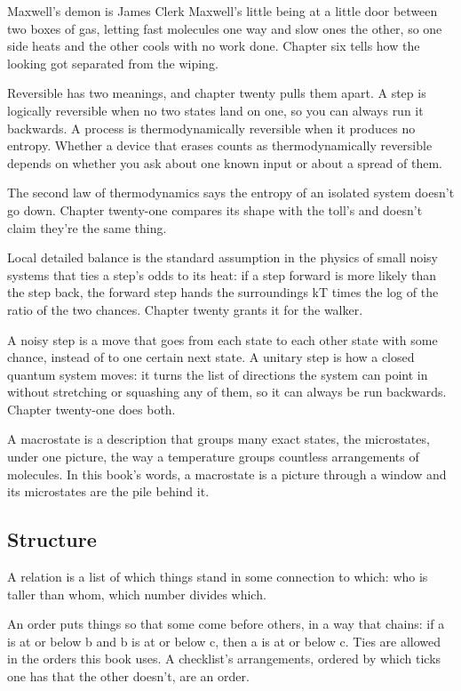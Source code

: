 \documentclass[11pt,twoside]{article}
\theoremstyle{thielethm}
\theoremstyle{thieledef}
\theoremstyle{thieledef}
\theoremstyle{thieledef}
\theoremstyle{thielethm}
\theoremstyle{thieleobs}
\theoremstyle{thielethm}
\begin{document}
Maxwell's demon is James Clerk Maxwell's little being at a little door between two boxes of gas, letting fast molecules one way and slow ones the other, so one side heats and the other cools with no work done. Chapter six tells how the looking got separated from the wiping.

Reversible has two meanings, and chapter twenty pulls them apart. A step is logically reversible when no two states land on one, so you can always run it backwards. A process is thermodynamically reversible when it produces no entropy. Whether a device that erases counts as thermodynamically reversible depends on whether you ask about one known input or about a spread of them.

The second law of thermodynamics says the entropy of an isolated system doesn't go down. Chapter twenty-one compares its shape with the toll's and doesn't claim they're the same thing.

Local detailed balance is the standard assumption in the physics of small noisy systems that ties a step's odds to its heat: if a step forward is more likely than the step back, the forward step hands the surroundings kT times the log of the ratio of the two chances. Chapter twenty grants it for the walker.

A noisy step is a move that goes from each state to each other state with some chance, instead of to one certain next state. A unitary step is how a closed quantum system moves: it turns the list of directions the system can point in without stretching or squashing any of them, so it can always be run backwards. Chapter twenty-one does both.

A macrostate is a description that groups many exact states, the microstates, under one picture, the way a temperature groups countless arrangements of molecules. In this book's words, a macrostate is a picture through a window and its microstates are the pile behind it.

\subsection{Structure}

A relation is a list of which things stand in some connection to which: who is taller than whom, which number divides which.

An order puts things so that some come before others, in a way that chains: if a is at or below b and b is at or below c, then a is at or below c. Ties are allowed in the orders this book uses. A checklist's arrangements, ordered by which ticks one has that the other doesn't, are an order.
\end{document}
